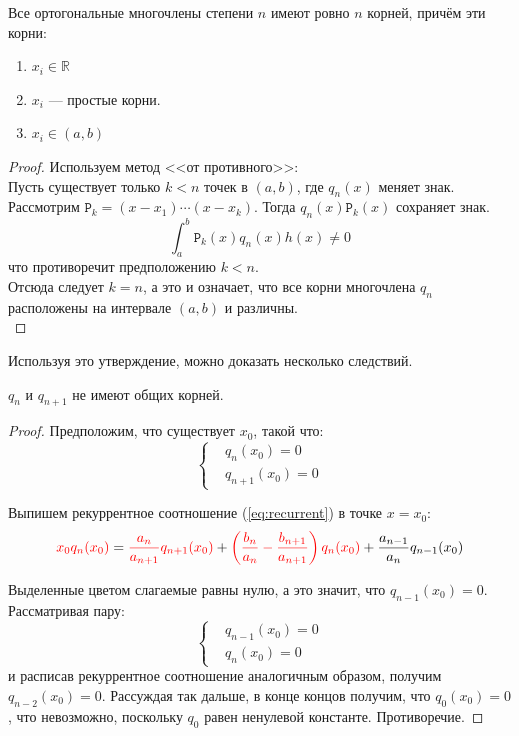 \documentclass[12pt]{article}
\begin{document}
		\begin{state}
			Все ортогональные многочлены степени $n$ имеют ровно $n$ корней, причём эти корни:
			\begin{enumerate}
				\item $x_i \in \mathbb{R}$
				\item $x_i$ --- простые корни.
				\item $x_i \in (a,b)$
			\end{enumerate}
			\begin{proof}
			Используем метод <<от противного>>: \\
			Пусть существует только $k < n$ точек в $(a,b)$, где $q_n(x)$ меняет знак. Рассмотрим 
			$\mathtt{P}_k = (x - x_1) \cdots (x - x_k)$. Тогда $q_n(x) \mathtt{P}_k(x)$ сохраняет знак. 
			$$ \int_a^b \mathtt{P}_k (x) q_n(x) h(x) \neq 0$$
			что противоречит предположению $k < n$. \\
			Отсюда следует $k = n$, а это и означает, что все корни многочлена $q_n$ расположены на интервале $(a,b)$ 
			и различны.\\
			\end{proof}
		\end{state}

		Используя это утверждение, можно доказать несколько следствий.

		\begin{state}
			$q_n$ и $q_{n+1}$ не имеют общих корней.
			\begin{proof}
				Предположим, что существует $x_0$, такой что:
				\begin{equation*}
					\left\lbrace
					\begin{split}
						&q_n(x_0)=0 \\
						&q_{n+1}(x_0)=0
					\end{split}
					\right.
				\end{equation*}
				
				Выпишем рекуррентное соотношение (\ref{eq:recurrent}) в точке $x=x_0$:
				\begin{equation*}
				{\color{red} x_0 q_n(x_0)} = {\color{red} \frac{a_n}{a_{n+1}} q_{n+1}(x_0)} + 
					{\color{red} \left(\frac{b_n}{a_n} - \frac{b_{n+1}}{a_{n+1}}\right) q_n(x_0)} + \frac{a_{n-1}}{a_n} q_{n-1}(x_0)
				\end{equation*}
				
				Выделенные цветом слагаемые равны нулю, а это значит, что $q_{n-1}(x_0)=0$. Рассматривая
				пару:
				\begin{equation*}
					\left\lbrace
					\begin{split}
						&q_{n-1}(x_0)=0 \\
						&q_n(x_0)=0
					\end{split}
					\right.
				\end{equation*}
				и расписав рекуррентное соотношение аналогичным образом, получим $q_{n-2}(x_0)=0$. Рассуждая
				так дальше, в конце концов получим, что $q_0(x_0)=0$, что невозможно, поскольку $q_0$ равен
				ненулевой константе. Противоречие.
			\end{proof}
		\end{state}
\end{document}
